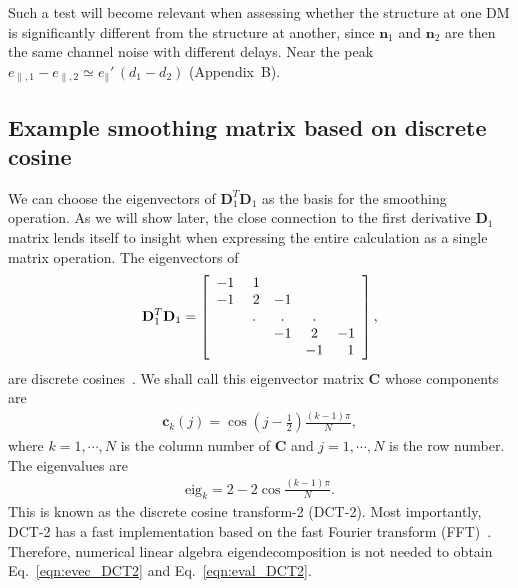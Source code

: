 \documentclass[twocolumn]{aastex631}
\begin{document}
Such a test will become relevant when assessing whether the structure at one DM is significantly different from the structure at another, since $\mathbf{n}_1$ and $\mathbf{n}_2$ are then the same channel noise with different delays. Near the peak $e_{\parallel,1}-e_{\parallel,2}\simeq e_\parallel'\,(d_1-d_2)$ (Appendix~B).

\subsection{Example smoothing matrix based on discrete cosine}\label{sec:smooth_DCT}
We can choose the eigenvectors of $\mathbf{D}_1^T\mathbf{D}_1$ as the basis for the smoothing operation. As we will show later, the close connection to the first derivative $\mathbf{D}_1$ matrix lends itself to insight when expressing the entire calculation as a single matrix operation. The eigenvectors of
\begin{eqnarray}
\mathbf{D}_1^T\mathbf{D}_1=
\left[ \begin{array}{c c c c c} 
-1 & ~1 &  &  & \\ 
-1 & ~2 & -1 &  &\\
 & . & . & . & \\
 & & -1 & 2 & -1 \\
 &   &   & -1 & ~~1 
\end{array} \right],
\label{eqn:D1TD1}
\end{eqnarray} 
are discrete cosines~\citep{Strang_DCT}. We shall call this eigenvector matrix $\mathbf{C}$ whose components are
\begin{eqnarray}
\mathbf{c}_k(j)=\cos\left(j-\frac{1}{2}\right)\frac{(k-1)\pi}{N},
\label{eqn:evec_DCT2}
\end{eqnarray} 
where $k=1,\cdots,N$ is the column number of $\mathbf{C}$ and $j=1,\cdots,N$ is the row number. The eigenvalues are
\begin{eqnarray}
\text{eig}_k=2-2\cos\frac{(k-1)\pi}{N}.
\label{eqn:eval_DCT2}
\end{eqnarray}
This is known as the discrete cosine transform-2 (DCT-2). Most importantly, DCT-2 has a fast implementation based on the fast Fourier transform (FFT)~\citep{Strang_DCT}. Therefore, numerical linear algebra eigendecomposition is not needed to obtain Eq.~\eqref{eqn:evec_DCT2} and Eq.~\eqref{eqn:eval_DCT2}. 
\end{document}

